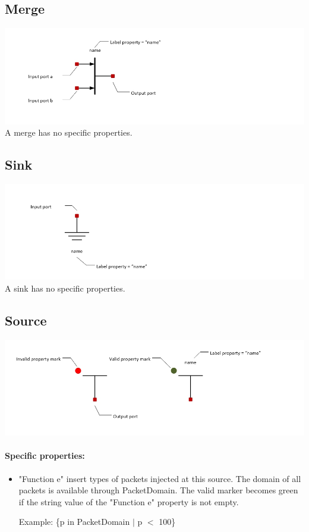 \documentclass[a4paper,11pt,final]{article}
\begin{document}
\subsection{Merge}
\includegraphics[width=1.0\textwidth]{merge}
A merge has no specific properties.

\subsection{Sink}
\includegraphics[width=1.0\textwidth]{sink}
A sink has no specific properties.

\subsection{Source}
\includegraphics[width=1.0\textwidth]{source}
\paragraph{Specific properties:}
\begin{itemize}
\item "Function e" insert types of packets injected at this source. The domain of all packets is available through PacketDomain.
The valid marker becomes green if the  string value of the "Function e" property is not empty.

Example: \{p in PacketDomain $|$ p $<$ 100\}
\end{itemize}
\end{document}
